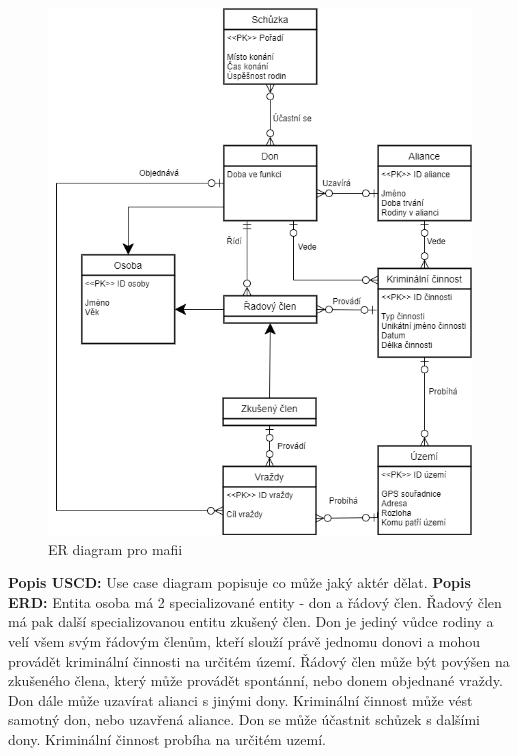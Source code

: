 \documentclass{article}
\begin{document}
\begin{figure}[!ht]
    \flushleft
    \includegraphics[scale=0.60, keepaspectratio]{fig/ERD.png}
    \caption{ER diagram pro mafii}
    \label{fig:ERD}
\end{figure}

\newpage
\flushleft
\large \textbf{Popis USCD:} \newline
Use case diagram popisuje co může jaký aktér dělat. \newline
\large \textbf{Popis ERD:} \newline
Entita osoba má 2 specializované entity - don a řádový člen. Řadový člen má pak další specializovanou entitu zkušený člen. Don je jediný vůdce rodiny a velí všem svým řádovým členům, kteří slouží právě jednomu donovi a mohou provádět kriminální činnosti na určitém území. Řádový člen může být povýšen na zkušeného člena, který může provádět spontánní, nebo donem objednané vraždy. Don dále může uzavírat alianci s jinými dony. Kriminální činnost může vést samotný don, nebo uzavřená aliance. Don se může účastnit schůzek s dalšími dony. Kriminální činnost probíha na určitém uzemí.
\end{document}
